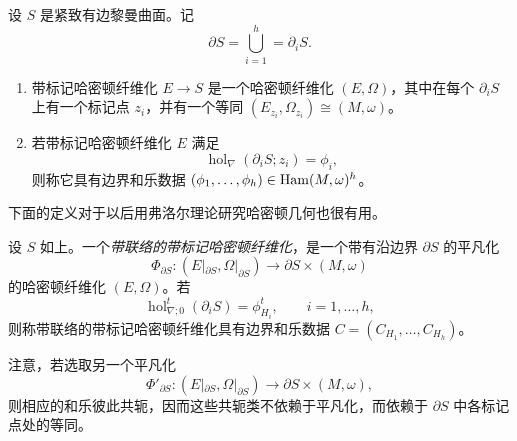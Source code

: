 \begin{definition}\label{def:marked-hamiltonian-fibration}
设 $S$ 是紧致有边黎曼曲面。记
\[
 \partial S=\bigcup_{i=1}^h=\partial_iS.
\]
\begin{enumerate}[label=(\arabic*)]
\item
带标记哈密顿纤维化 $E\to S$ 是一个哈密顿纤维化 $(E,\Omega)$，其中在每个 $\partial_iS$ 上有一个标记点 $z_i$，并有一个等同
$(E_{z_i},\Omega_{z_i})\cong(M,\omega)$。
\item
若带标记哈密顿纤维化 $E$ 满足
\begin{equation}
 \operatorname{hol}_\nabla(\partial_iS;z_i)=\phi_i,
 \label{eq:marked-boundary-holonomy}
\end{equation}
则称它具有边界和乐数据
$(\phi_1,\ldots,\phi_h)\in\operatorname{Ham}(M,\omega)^h$。
\end{enumerate}
\end{definition}

下面的定义对于以后用弗洛尔理论研究哈密顿几何也很有用。

\begin{definition}\label{def:marked-hamiltonian-fibration-connection}
设 $S$ 如上。一个\emph{带联络的带标记哈密顿纤维化}，是一个带有沿边界
$\partial S$ 的平凡化
\[
 \Phi_{\partial S}:
 (E|_{\partial S},\Omega|_{\partial S})
 \longrightarrow\partial S\times(M,\omega)
\]
的哈密顿纤维化 $(E,\Omega)$。若
\begin{equation}
 \operatorname{hol}_{\nabla;0}^t(\partial_iS)=\phi_{H_i}^t,
 \qquad i=1,\ldots,h,
 \label{eq:marked-connection-boundary-holonomy}
\end{equation}
则称带联络的带标记哈密顿纤维化具有边界和乐数据
$C=(C_{H_1},\ldots,C_{H_h})$。
\end{definition}

注意，若选取另一个平凡化
\[
 \Phi'_{\partial S}:
 (E|_{\partial S},\Omega|_{\partial S})
 \longrightarrow\partial S\times(M,\omega),
\]
则相应的和乐彼此共轭，因而这些共轭类不依赖于平凡化，而依赖于
$\partial S$ 中各标记点处的等同。
